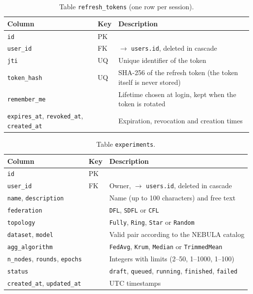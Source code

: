 \documentclass[9pt,a4paper,twocolumn]{article}
\begin{document}
\begin{table}[H]
\centering
\scriptsize
\begin{tabularx}{\columnwidth}{l l X}
\hline
\textbf{Column} & \textbf{Key} & \textbf{Description} \\
\hline
\texttt{id}          & PK &  \\
\texttt{user\_id}    & FK & $\rightarrow$ \texttt{users.id}, deleted in cascade \\
\texttt{jti}         & UQ & Unique identifier of the token \\
\texttt{token\_hash} & UQ & SHA-256 of the refresh token (the token itself is never stored) \\
\texttt{remember\_me} &   & Lifetime chosen at login, kept when the token is rotated \\
\texttt{expires\_at}, \texttt{revoked\_at}, \texttt{created\_at} & & Expiration, revocation and creation times \\
\hline
\end{tabularx}
\caption{Table \texttt{refresh\_tokens} (one row per session).}
\label{tab:api-refresh}
\end{table}

\begin{table}[H]
\centering
\scriptsize
\begin{tabularx}{\columnwidth}{l l X}
\hline
\textbf{Column} & \textbf{Key} & \textbf{Description} \\
\hline
\texttt{id}          & PK &  \\
\texttt{user\_id}    & FK & Owner, $\rightarrow$ \texttt{users.id}, deleted in cascade \\
\texttt{name}, \texttt{description} & & Name (up to 100 characters) and free text \\
\texttt{federation}  &    & \texttt{DFL}, \texttt{SDFL} or \texttt{CFL} \\
\texttt{topology}    &    & \texttt{Fully}, \texttt{Ring}, \texttt{Star} or \texttt{Random} \\
\texttt{dataset}, \texttt{model} & & Valid pair according to the NEBULA catalog \\
\texttt{agg\_algorithm} &  & \texttt{FedAvg}, \texttt{Krum}, \texttt{Median} or \texttt{TrimmedMean} \\
\texttt{n\_nodes}, \texttt{rounds}, \texttt{epochs} & & Integers with limits (2--50, 1--1000, 1--100) \\
\texttt{status}      &    & \texttt{draft}, \texttt{queued}, \texttt{running}, \texttt{finished}, \texttt{failed} \\
\texttt{created\_at}, \texttt{updated\_at} & & UTC timestamps \\
\hline
\end{tabularx}
\caption{Table \texttt{experiments}.}
\label{tab:api-experiments}
\end{table}
\end{document}
